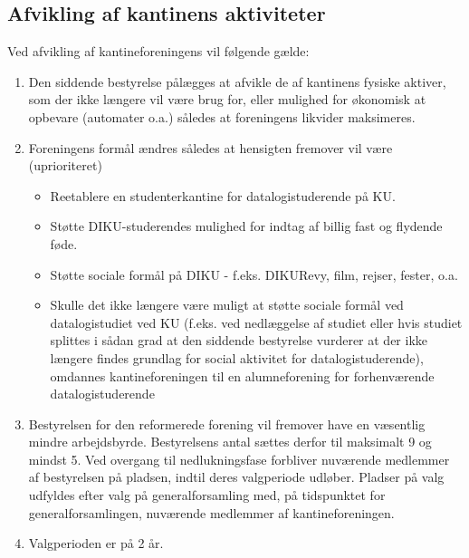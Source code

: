 \documentclass[a4paper, 10pt]{article}
\begin{document}
\subsection*{Afvikling af kantinens aktiviteter}

Ved afvikling af kantineforeningens vil følgende gælde:

\begin{enumerate}

\item Den siddende bestyrelse pålægges at afvikle de af kantinens
fysiske aktiver, som der ikke længere vil være brug for, eller
mulighed for øko\-nomisk at opbevare (automater o.a.) således at
foreningens likvider maksimeres.

\item Foreningens formål ændres således at hensigten fremover vil være
(uprioriteret)

\begin{itemize}

\item Reetablere en studenterkantine for datalogistuderende på KU.

\item Støtte DIKU-studerendes mulighed for indtag af billig fast og
flydende føde.

\item Støtte sociale formål på DIKU - f.eks. DIKURevy, film, rejser,
fester, o.a.

\item Skulle det ikke længere være muligt at støtte sociale formål ved
datalogistudiet ved KU (f.eks. ved nedlæggelse af studiet eller hvis
studiet splittes i sådan grad at den siddende bestyrelse vurderer at
der ikke længere findes grundlag for social aktivitet for
datalogistuderende), omdannes kantineforeningen til en alumneforening
for forhenværende datalogistuderende

\end{itemize}

\item Bestyrelsen for den reformerede forening vil fremover have en
væsentlig mindre arbejdsbyrde. Bestyrelsens antal sættes derfor til
maksimalt 9 og mindst 5. Ved overgang til nedlukningsfase forbliver
nuværende med\-lemmer af bestyrelsen på pladsen, indtil deres
valgperiode udløber. Plad\-ser på valg udfyldes efter valg på
generalforsamling med, på tidspunktet for generalforsamlingen,
nuværende medlemmer af kantineforeningen.

\item Valgperioden er på 2 år.


\end{enumerate}
\end{document}
